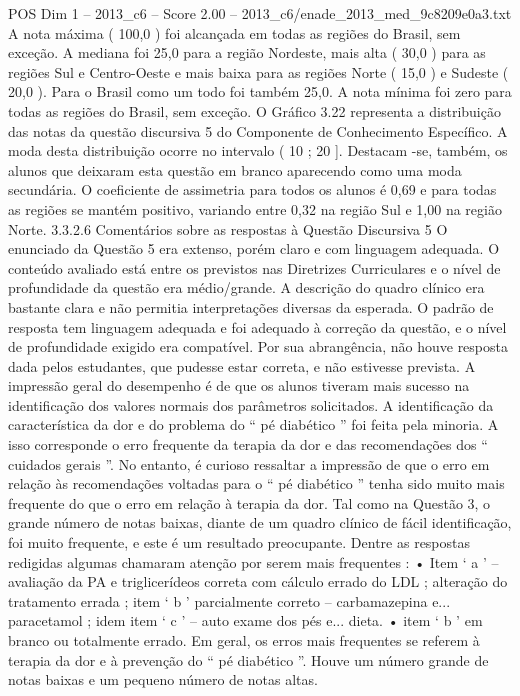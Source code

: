 \begin{textsample}{POS Dim 1 – 2013\_c6 – Score 2.00 – 2013\_c6/enade\_2013\_med\_9c8209e0a3.txt}
A nota máxima ( 100,0 ) foi alcançada em todas as regiões do Brasil, sem exceção.
A mediana foi 25,0 para a região Nordeste, mais alta ( 30,0 ) para as regiões Sul e Centro-Oeste e mais baixa para as regiões Norte ( 15,0 ) e Sudeste ( 20,0 ).
Para o Brasil como um todo foi também 25,0.
A nota mínima foi zero para todas as regiões do Brasil, sem exceção.
O Gráfico 3.22 representa a distribuição das notas da questão discursiva 5 do Componente de Conhecimento Específico.
A moda desta distribuição ocorre no intervalo ( 10 ; 20 ].
Destacam -se, também, os alunos que deixaram esta questão em branco aparecendo como uma moda secundária.
O coeficiente de assimetria para todos os alunos é 0,69 e para todas as regiões se mantém positivo, variando entre 0,32 na região Sul e 1,00 na região Norte. 3.3.2.6 Comentários sobre as respostas à Questão Discursiva 5 O enunciado da Questão 5 era extenso, porém claro e com linguagem adequada.
O conteúdo avaliado está entre os previstos nas Diretrizes Curriculares e o nível de profundidade da questão era médio/grande.
A descrição do quadro clínico era bastante clara e não permitia interpretações diversas da esperada.
O padrão de resposta tem linguagem adequada e foi adequado à correção da questão, e o nível de profundidade exigido era compatível.
Por sua abrangência, não houve resposta dada pelos estudantes, que pudesse estar correta, e não estivesse prevista.
A impressão geral do desempenho é de que os alunos tiveram mais sucesso na identificação dos valores normais dos parâmetros solicitados.
A identificação da característica da dor e do problema do “ pé diabético ” foi feita pela minoria.
A isso corresponde o erro frequente da terapia da dor e das recomendações dos “ cuidados gerais ”.
No entanto, é curioso ressaltar a impressão de que o erro em relação às recomendações voltadas para o “ pé diabético ” tenha sido muito mais frequente do que o erro em relação à terapia da dor.
Tal como na Questão 3, o grande número de notas baixas, diante de um quadro clínico de fácil identificação, foi muito frequente, e este é um resultado preocupante.
Dentre as respostas redigidas algumas chamaram atenção por serem mais frequentes : • Item ‘ a ’ – avaliação da PA e triglicerídeos correta com cálculo errado do LDL ; alteração do tratamento errada ; item ‘ b ’ parcialmente correto – carbamazepina e... paracetamol ; idem item ‘ c ’ – auto exame dos pés e... dieta. • item ‘ b ’ em branco ou totalmente errado.
Em geral, os erros mais frequentes se referem à terapia da dor e à prevenção do “ pé diabético ”.
Houve um número grande de notas baixas e um pequeno número de notas altas.

\end{textsample}
